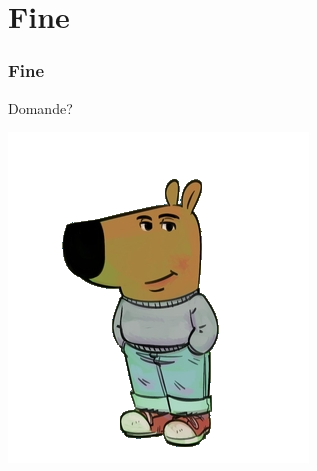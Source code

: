 \documentclass{beamer}
\begin{document}



    \section{Fine}

        \begin{frame}
            \frametitle{Fine}
            \centering
            \Huge{Domande?}

            \includegraphics{Chill.png}
        \end{frame}
\end{document}
